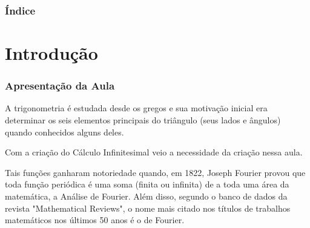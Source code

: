 \documentclass[10pt]{beamer}
\begin{document}
	


	{\backgroundimage\begin{frame}[plain]
		\titlepage
	\end{frame}}



	\begin{frame}
		\frametitle{Índice}
		\tableofcontents
	\end{frame}



\section{Introdução}

\begin{frame} \frametitle{Apresentação da Aula}

A trigonometria é estudada desde os gregos e sua motivação inicial
era determinar os seis elementos principais do triângulo (seus lados
e ângulos) quando conhecidos alguns deles.

Com a criação do Cálculo Infinitesimal veio a necessidade da criação
nessa aula.

Tais funções ganharam notoriedade quando, em 1822, Joseph Fourier
provou que toda função periódica é uma soma (finita ou infinita) de
a toda uma área da matemática, a Análise de Fourier. Além disso,
segundo o banco de dados da revista "Mathematical Reviews", o nome
mais citado nos títulos de trabalhos matemáticos nos últimos 50 anos
é o de Fourier.

\end{frame}

\def\cos{cos}
\end{document}
